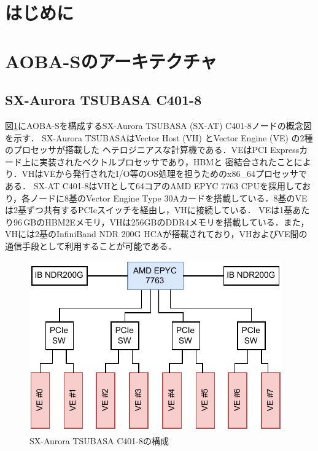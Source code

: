 ﻿\documentclass[submit,techrep,noauthor]{ipsj}
\begin{document}
\maketitle

\section{はじめに}

\section{AOBA-Sのアーキテクチャ}

\subsection{SX-Aurora TSUBASA C401-8}

図\ref{fig:node}にAOBA-Sを構成するSX-Aurora TSUBASA (SX-AT) C401-8ノードの概念図を示す．
SX-Aurora TSUBASAはVector Host (VH) とVector Engine (VE) の2種のプロセッサが搭載した
ヘテロジニアスな計算機である．VEはPCI Expressカード上に実装されたベクトルプロセッサであり，HBMと
密結合されたことにより．VHはVEから発行されたI/O等のOS処理を担うためのx86\_64プロセッサである．
SX-AT C401-8はVHとして64コアのAMD EPYC 7763 CPUを採用しており，各ノードに8基のVector Engine Type
30Aカードを搭載している．8基のVEは2基ずつ共有するPCIeスイッチを経由し，VHに接続している．
VEは1基あたり96\,GBのHBM2Eメモリ，VHは256GBのDDR4メモリを搭載している．また，VHには2基のInfiniBand
NDR 200G HCAが搭載されており，VHおよびVE間の通信手段として利用することが可能である．

\begin{figure}
  \centering
  \includegraphics{figs/node_arch.pdf}
  \caption{SX-Aurora TSUBASA C401-8の構成}\label{fig:node}
\end{figure}
\end{document}
